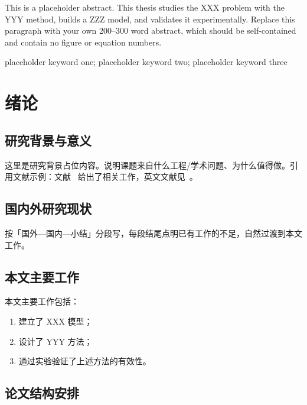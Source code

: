 \documentclass[UTF8,a4paper,zihao=-4,fontset=\swfontset,openany]{ctexbook}
\begin{document}
This is a placeholder abstract. This thesis studies the XXX problem with the YYY method, builds a ZZZ model, and validates it experimentally. Replace this paragraph with your own 200--300 word abstract, which should be self-contained and contain no figure or equation numbers.

\vspace{1em}
 placeholder keyword one; placeholder keyword two; placeholder keyword three

\tableofcontents

\mainmatter   %

\chapter{绪论}
\label{chap:intro}

\section{研究背景与意义}

这里是研究背景占位内容。说明课题来自什么工程/学术问题、为什么值得做。引用文献示例：文献~\cite{zhang2024demo} 给出了相关工作，英文文献见~\cite{smith2023demo}。

\section{国内外研究现状}

按「国外—国内—小结」分段写，每段结尾点明已有工作的不足，自然过渡到本文工作。

\section{本文主要工作}

本文主要工作包括：
\begin{enumerate}
  \item 建立了 XXX 模型；
  \item 设计了 YYY 方法；
  \item 通过实验验证了上述方法的有效性。
\end{enumerate}

\section{论文结构安排}
\end{document}
